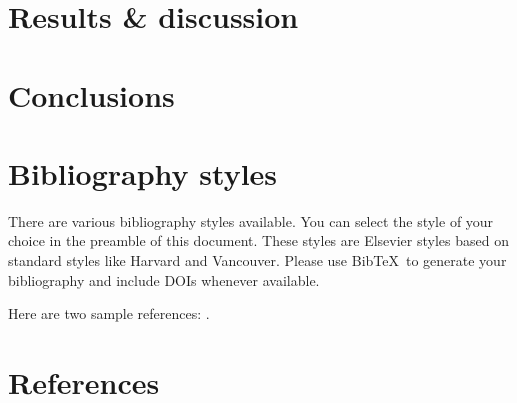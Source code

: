 \documentclass[review]{elsarticle}
\begin{document}
\clearpage
\section{Results \& discussion}

\section{Conclusions}

\section{Bibliography styles}

There are various bibliography styles available. You can select the style of your choice in the preamble of this document. These styles are Elsevier styles based on standard styles like Harvard and Vancouver. Please use Bib\TeX\ to generate your bibliography and include DOIs whenever available.

Here are two sample references: \cite{Feynman1963118,Dirac1953888}.

\section*{References}


\end{document}
